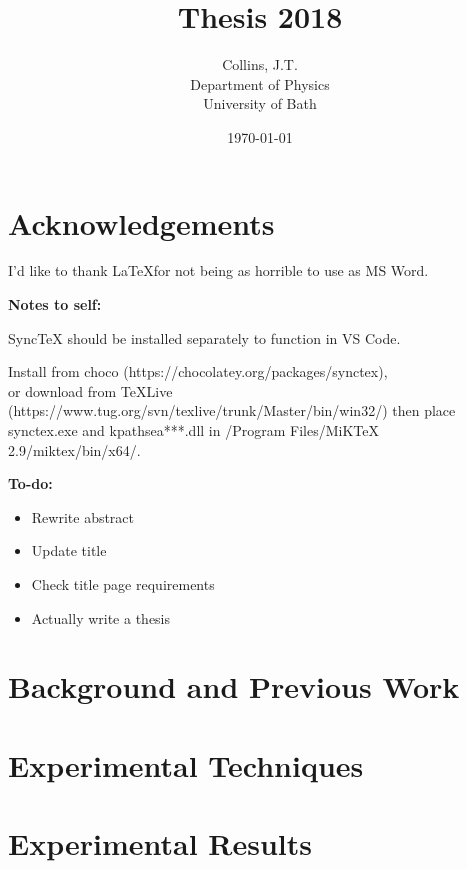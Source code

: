 \documentclass[11pt,a4paper,final]{report}
\title{Thesis 2018}
\author{
	Collins, J.T. \\ 
	Department of Physics\\
	University of Bath\\
}
\date{\today}
\begin{document}
\begin{titlepage}
    
\end{titlepage}

\clearpage
\tableofcontents
\clearpage

\begin{abstract}
    
\end{abstract}
\clearpage


\chapter*{Acknowledgements}
I'd like to thank \LaTeX  for not being as horrible to use as MS Word.

\noindent\textbf{Notes to self:}

\noindent SyncTeX should be installed separately to function in VS Code. 

\noindent Install from choco (https://chocolatey.org/packages/synctex), \\or download from TeXLive (https://www.tug.org/svn/texlive/trunk/Master/bin/win32/) then place synctex.exe and kpathsea***.dll in /Program Files/MiKTeX 2.9/miktex/bin/x64/.


\noindent\textbf{To-do:}
\begin{itemize}
	\item Rewrite abstract
	\item Update title
	\item Check title page requirements
    \item Actually write a thesis
\end{itemize}


\chapter{Background and Previous Work}\label{sec:background}




\chapter{Experimental Techniques}\label{sec:techniques}





\chapter{Experimental Results}\label{sec:results}
\clearpage
\clearpage
\clearpage
\clearpage




\clearpage

\appendix

\end{document}
